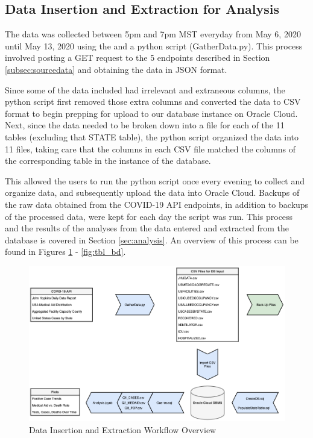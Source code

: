 \documentclass[11pt]{article}
\newcommand{\MYhref}[3][blue]{\href{#2}{\color{#1}{#3}}}%
\begin{document}
\subsection{Data Insertion and Extraction for Analysis}
\label{subsec:insertextract}

\noindent
The data was collected between 5pm and 7pm MST everyday from May 6, 2020 until May 13, 2020 using the \MYhref{https://www.npmjs.com/package/covid19-api}{Covid-19 API} and a python script (GatherData.py). This process involved posting a GET request to the 5 endpoints described in Section \ref{subsec:sourcedata} and obtaining the data in JSON format. 

\noindent
Since some of the data included had irrelevant and extraneous columns, the python script first removed those extra columns and converted the data to CSV format to begin prepping for upload to our database instance on Oracle Cloud. Next, since the data needed to be broken down into a file for each of the 11 tables (excluding that STATE table), the python script organized the data into 11 files, taking care that the columns in each CSV file matched the columns of the corresponding table in the instance of the database.

\noindent
This allowed the users to run the python script once every evening to collect and organize data, and subsequently upload the data into Oracle Cloud. Backups of the raw data obtained from the COVID-19 API endpoints, in addition to backups of the processed data, were kept for each day the script was run. This process and the results of the analyses from the data entered and extracted from the database is covered in Section \ref{sec:analysis}. An overview of this process can be found in Figures \ref{fig:my_label} - \ref{fig:tbl_bd}.

\FloatBarrier
\begin{figure}[h]
    \centering
    \includegraphics[width=\textwidth]{diagrams/DataInsertionExtraction.png}
    \caption{Data Insertion and Extraction Workflow Overview}
    \label{fig:my_label}
\end{figure}
\FloatBarrier
\end{document}
